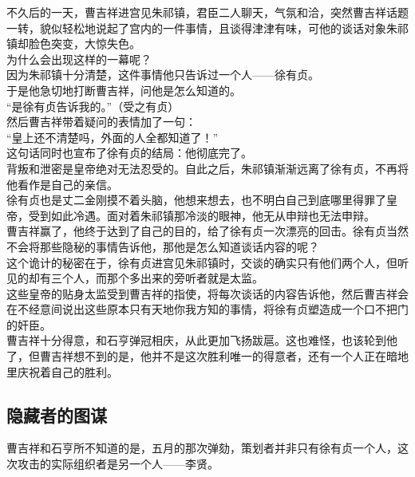 \begin{multicols}{\theparacolNo}
不久后的一天，曹吉祥进宫见朱祁镇，君臣二人聊天，气氛和洽，突然曹吉祥话题一转，貌似轻松地说起了宫内的一件事情，且谈得津津有味，可他的谈话对象朱祁镇却脸色突变，大惊失色。\\

为什么会出现这样的一幕呢？\\

因为朱祁镇十分清楚，这件事情他只告诉过一个人——徐有贞。\\

于是他急切地打断曹吉祥，问他是怎么知道的。\\

“是徐有贞告诉我的。”（受之有贞）\\

然后曹吉祥带着疑问的表情加了一句：\\

“皇上还不清楚吗，外面的人全都知道了！”\\

这句话同时也宣布了徐有贞的结局：他彻底完了。\\

背叛和泄密是皇帝绝对无法忍受的。自此之后，朱祁镇渐渐远离了徐有贞，不再将他看作是自己的亲信。\\

徐有贞也是丈二金刚摸不着头脑，他想来想去，也不明白自己到底哪里得罪了皇帝，受到如此冷遇。面对着朱祁镇那冷淡的眼神，他无从申辩也无法申辩。\\

曹吉祥赢了，他终于达到了自己的目的，给了徐有贞一次漂亮的回击。徐有贞当然不会将那些隐秘的事情告诉他，那他是怎么知道谈话内容的呢？\\

这个诡计的秘密在于，徐有贞进宫见朱祁镇时，交谈的确实只有他们两个人，但听见的却有三个人，而那个多出来的旁听者就是太监。\\

这些皇帝的贴身太监受到曹吉祥的指使，将每次谈话的内容告诉他，然后曹吉祥会在不经意间说出这些原本只有天地你我方知的事情，将徐有贞塑造成一个口不把门的奸臣。\\

曹吉祥十分得意，和石亨弹冠相庆，从此更加飞扬跋扈。这也难怪，也该轮到他了，但曹吉祥想不到的是，他并不是这次胜利唯一的得意者，还有一个人正在暗地里庆祝着自己的胜利。\\

\subsection{隐藏者的图谋}
曹吉祥和石亨所不知道的是，五月的那次弹劾，策划者并非只有徐有贞一个人，这次攻击的实际组织者是另一个人——李贤。\\


\end{multicols}
